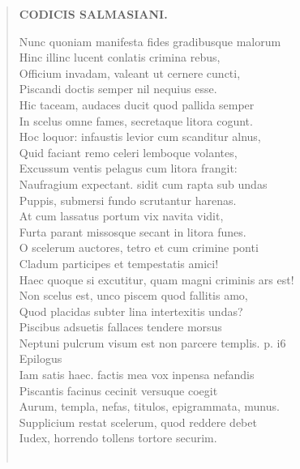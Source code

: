 \documentclass[11pt, a4paper]{report}
\begin{document}
\begin{verse}
    \begin{center} \textbf{CODICIS SALMASIANI.} \end{center} \marginpar{[95]} Nunc quoniam manifesta fides gradibusque malorum \\ Hinc illinc lucent conlatis crimina rebus, \\ Officium invadam, valeant ut cernere cuncti, \\ Piscandi doctis semper nil nequius esse. \\ Hic taceam, audaces ducit quod pallida semper \\ In scelus omne fames, secretaque litora cogunt. \\ Hoc loquor: infaustis levior cum scanditur alnus, \\ Quid faciant remo celeri lemboque volantes, \\ Excussum ventis pelagus cum litora frangit: \\ Naufragium expectant. sidit cum rapta sub undas \\ Puppis, submersi fundo scrutantur harenas. \\ At cum lassatus portum vix navita vidit, \\ Furta parant missosque secant in litora funes. \\ O scelerum auctores, tetro et cum crimine ponti \\ Cladum participes et tempestatis amici! \\ Haec quoque si excutitur, quam magni criminis ars est! \\ Non scelus est, unco piscem quod fallitis amo, \\ Quod placidas subter lina intertexitis undas? \\ Piscibus adsuetis fallaces tendere morsus \\ Neptuni pulcrum visum est non parcere templis. p. i6 \\ Epilogus \\ Iam satis haec. factis  \lbrack mea \rbrack  vox inpensa nefandis \\ Piscantis facinus cecinit versuque coegit \\ Aurum, templa, nefas, titulos, epigrammata, munus. \\ Supplicium restat scelerum, quod reddere debet \\ Iudex, horrendo tollens tortore securim. \\ 
        ﻿\pagebreak 

\end{verse}
\end{document}
